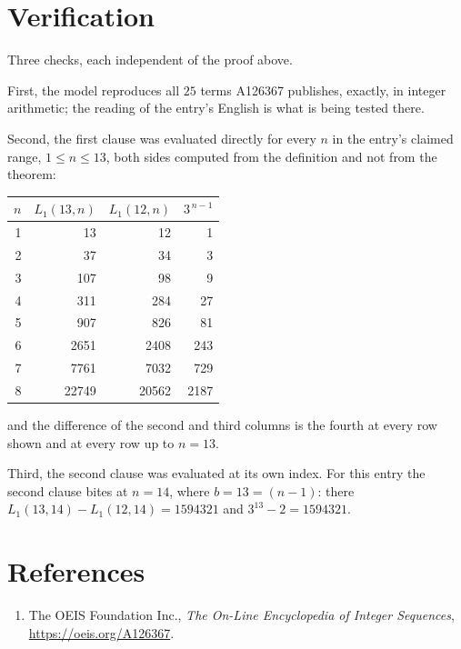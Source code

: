\documentclass[11pt,a4paper]{article}
\theoremstyle{plain}
\theoremstyle{definition}
\begin{document}
\section{Verification}

Three checks, each independent of the proof above.

First, the model reproduces all $25$ terms A126367 publishes, exactly, in integer
arithmetic; the reading of the entry's English is what is being tested there.

Second, the first clause was evaluated directly for every $n$ in the entry's claimed range,
$1\le n\le13$, both sides computed from the definition and not from the theorem:

\begin{center}
\begin{tabular}{rrrr}
$n$ & $L_{1}(13,n)$ & $L_{1}(12,n)$ & $3^{\,n-1}$ \\ \hline
1 & 13 & 12 & 1 \\
2 & 37 & 34 & 3 \\
3 & 107 & 98 & 9 \\
4 & 311 & 284 & 27 \\
5 & 907 & 826 & 81 \\
6 & 2651 & 2408 & 243 \\
7 & 7761 & 7032 & 729 \\
8 & 22749 & 20562 & 2187 \\
\end{tabular}
\end{center}

\noindent and the difference of the second and third columns is the fourth at every row shown
and at every row up to $n=13$.

Third, the second clause was evaluated at its own index. For this entry the second clause bites at $n=14$, where $b=13=(n-1)$: there $L_{1}(13,14)-L_{1}(12,14)=1594321$ and $3^{13}-2=1594321$.

\section*{References}
\begin{enumerate}
\item The OEIS Foundation Inc., \emph{The On-Line Encyclopedia of Integer Sequences},
\url{https://oeis.org/A126367}.
\end{enumerate}
\end{document}
